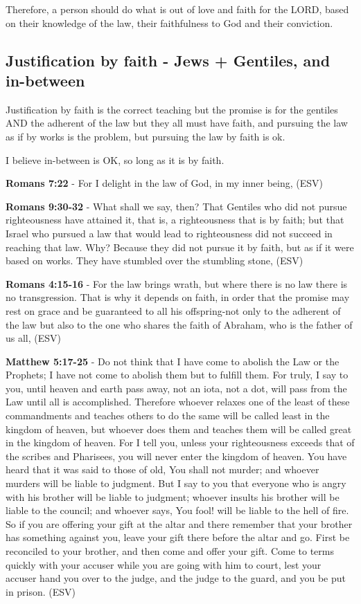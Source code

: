 \documentclass[11pt]{article}
\begin{document}
Therefore, a person should do what is out of love and faith for the LORD, based on their knowledge of the law,
their faithfulness to God and their conviction.

\subsection{Justification by faith - Jews + Gentiles, and in-between}
\label{sec:org8c85c87}
Justification by faith is the correct teaching but the promise is for the gentiles AND the adherent of the law but they all must have faith, and pursuing the law as if by works is the problem, but pursuing the law by faith is ok.

I believe in-between is OK, so long as it is by faith.

\textbf{Romans 7:22} - For I delight in the law of God, in my inner being, (ESV)

\textbf{Romans 9:30-32} - What shall we say, then? That Gentiles who did not pursue righteousness have attained it, that is, a righteousness that is by faith; but that Israel who pursued a law that would lead to righteousness did not succeed in reaching that law. Why? Because they did not pursue it by faith, but as if it were based on works. They have stumbled over the stumbling stone, (ESV)

\textbf{Romans 4:15-16} - For the law brings wrath, but where there is no law there is no transgression. That is why it depends on faith, in order that the promise may rest on grace and be guaranteed to all his offspring-not only to the adherent of the law but also to the one who shares the faith of Abraham, who is the father of us all, (ESV)

\textbf{Matthew 5:17-25} - Do not think that I have come to abolish the Law or the Prophets; I have not come to abolish them but to fulfill them. For truly, I say to you, until heaven and earth pass away, not an iota, not a dot, will pass from the Law until all is accomplished. Therefore whoever relaxes one of the least of these commandments and teaches others to do the same will be called least in the kingdom of heaven, but whoever does them and teaches them will be called great in the kingdom of heaven. For I tell you, unless your righteousness exceeds that of the scribes and Pharisees, you will never enter the kingdom of heaven. You have heard that it was said to those of old, You shall not murder; and whoever murders will be liable to judgment. But I say to you that everyone who is angry with his brother will be liable to judgment; whoever insults his brother will be liable to the council; and whoever says, You fool! will be liable to the hell of fire. So if you are offering your gift at the altar and there remember that your brother has something against you, leave your gift there before the altar and go. First be reconciled to your brother, and then come and offer your gift. Come to terms quickly with your accuser while you are going with him to court, lest your accuser hand you over to the judge, and the judge to the guard, and you be put in prison. (ESV)
\end{document}
